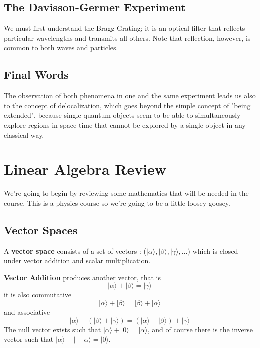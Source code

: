\documentclass[english, 11pt]{article}
\newcommand{\ket}[1]{| #1 \rangle}
\begin{document}
     \subsection{The Davisson-Germer Experiment}
       We must first understand the Bragg Grating; it is an optical filter that reflects particular wavelengths and transmits all others. Note that reflection, however, is common to both waves and particles.

     \subsection{Final Words}
       The observation of both phenomena in one and the same experiment leads us also to the concept of delocalization, which goes beyond the simple concept of "being extended", because single quantum objects seem to be able to simultaneously explore regions in space-time that cannot be explored by a single object in any classical way.

   \section{Linear Algebra Review}

     We're going to begin by reviewing some mathematics that will be needed in the course. This is a physics course so we're going to be a little loosey-goosey.

     \subsection{Vector Spaces}
        \begin{defn}\label{vector_space}
          A {\bf vector space} consists of a set of vectors : ($|\alpha\rangle, |\beta\rangle, |\gamma\rangle, \ldots$) which is closed under vector addition and scalar multiplication.
        \end{defn}
        {\bf Vector Addition} produces another vector, that is
        \[ \ket{\alpha} + \ket{\beta} = \ket{\gamma}  \]
        it is also commutative
        \[ \ket{\alpha} + \ket{\beta} =  \ket{\beta}  + \ket{\alpha} \]
        and associative
        \[ \ket{\alpha} + (\ket{\beta} + \ket{\gamma}) =  (\ket{\alpha}+\ket{\beta} ) + \ket{\gamma} \]
        The null vector exists such that $\ket{\alpha} + \ket{0} = \ket{\alpha}$, and of course there is the inverse vector such that $\ket{\alpha} + \ket{-\alpha} = \ket{0}$.
        \newline
\end{document}
